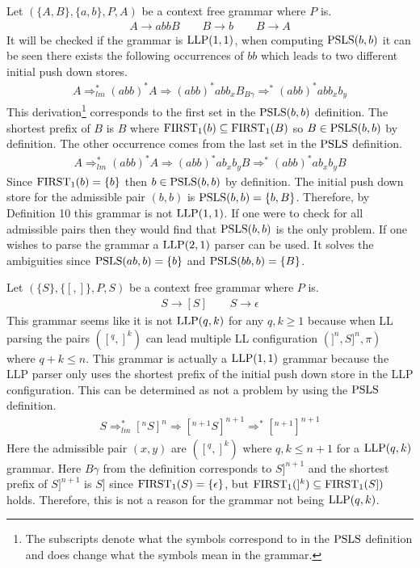 \begin{example}
    \label{ex:llp21}
    Let $(\{A, B\}, \{a, b\}, P, A)$ be a context free grammar where $P$ is.
    \begin{gather*}
        A \to a b b B \qquad B \to b \qquad B \to A
    \end{gather*}
    It will be checked if the grammar is $\text{LLP}(1, 1)$, when computing $\text{PSLS}(b,b)$ it can be seen there exists the following occurrences of $bb$ which leads to two different initial push down stores.
    \begin{align*}
        A \Rightarrow_{lm}^* (abb)^*A \Rightarrow (abb)^*abb_xB_{B\gamma} \Rightarrow^* (abb)^*abb_xb_y
    \end{align*}
    This derivation\footnote{The subscripts denote what the symbols correspond to in the $\text{PSLS}$ definition and does change what the symbols mean in the grammar.} corresponds to the first set in the $\text{PSLS}(b, b)$ definition. The shortest prefix of $B$ is $B$ where $\text{FIRST}_1(b) \subseteq \text{FIRST}_1(B)$ so $B \in \text{PSLS}(b,b)$ \cite[2]{errata:Vagner2007} by definition. The other occurrence comes from the last set in the $\text{PSLS}$ definition.
    \begin{align*}
        A \Rightarrow_{lm}^* (abb)^*A \Rightarrow (abb)^*ab_xb_yB \Rightarrow^* (abb)^*ab_xb_yB
    \end{align*}
    Since $\text{FIRST}_1(b) = \{b\}$ then $b \in \text{PSLS}(b, b)$ by definition. The initial push down store for the admissible pair $(b, b)$ is $\text{PSLS}(b, b) = \{b, B\}$. Therefore, by Definition 10 \cite[13]{Vagner2007} this grammar is not $\text{LLP}(1, 1)$. If one were to check for all admissible pairs then they would find that $\text{PSLS}(b,b)$ is the only problem. If one wishes to parse the grammar a $\text{LLP}(2, 1)$ parser can be used. It solves the ambiguities since $\text{PSLS}(ab, b) = \{b\}$ and $\text{PSLS}(bb, b) = \{B\}$.
\end{example}

\begin{example}
    Let $(\{S\}, \{[, ]\}, P, S)$ be a context free grammar where $P$ is.
    \begin{gather*}
        S \to [S] \qquad S \to \epsilon
    \end{gather*}
    This grammar seems like it is not $\text{LLP}(q, k)$ for any $q, k \geq 1$ because when LL parsing the pairs $([^q, ]^k)$ can lead multiple LL configuration $(]^n, S]^n, \pi)$ where $q + k \leq n$. This grammar is actually a $\text{LLP}(1,1)$ grammar because the LLP parser only uses the shortest prefix of the initial push down store in the LLP configuration. This can be determined as not a problem by using the $\text{PSLS}$ definition.
    \begin{align*}
        S \Rightarrow_{lm}^* [^nS]^n \Rightarrow [^{n + 1}S]^{n + 1} \Rightarrow^* [^{n + 1}]^{n + 1}
    \end{align*}
    Here the admissible pair $(x, y)$ are $([^q, ]^k)$ where $q, k \leq n + 1$ for a $\text{LLP}(q, k)$ grammar. Here $B\gamma$ from the definition corresponds to $S]^{n+1}$ and the shortest prefix of $S]^{n+1}$ is $S]$ since $\text{FIRST}_1(S) = \{\epsilon\}$, but $\text{FIRST}_1(]^k) \subseteq \text{FIRST}_1(S])$ holds. Therefore, this is not a reason for the grammar not being $\text{LLP}(q,k)$.
\end{example}

